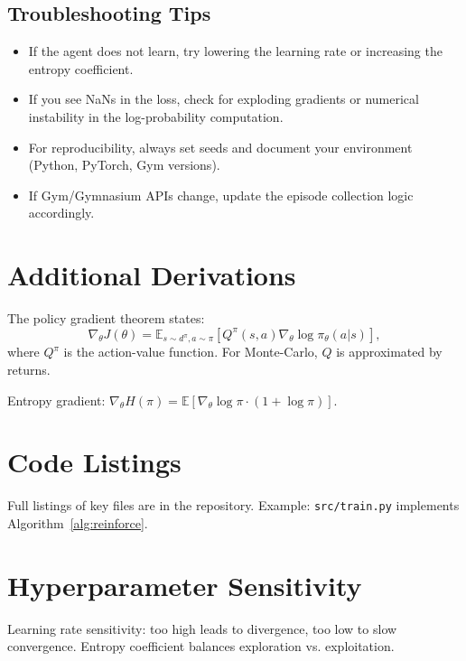 \documentclass[conference]{IEEEtran}
\begin{document}
\subsection{Troubleshooting Tips}
\begin{itemize}
    \item If the agent does not learn, try lowering the learning rate or increasing the entropy coefficient.
    \item If you see NaNs in the loss, check for exploding gradients or numerical instability in the log-probability computation.
    \item For reproducibility, always set seeds and document your environment (Python, PyTorch, Gym versions).
    \item If Gym/Gymnasium APIs change, update the episode collection logic accordingly.
\end{itemize}

\section{Additional Derivations}
\label{app:derivations}

The policy gradient theorem states:
\[
\nabla_\theta J(\theta) = \mathbb{E}_{s \sim d^\pi, a \sim \pi} [Q^\pi(s,a) \nabla_\theta \log \pi_\theta(a|s)],
\]
where $Q^\pi$ is the action-value function. For Monte-Carlo, $Q$ is approximated by returns.

Entropy gradient: $\nabla_\theta H(\pi) = \mathbb{E} [\nabla_\theta \log \pi \cdot (1 + \log \pi)]$.

\section{Code Listings}
\label{app:code}

Full listings of key files are in the repository. Example: \texttt{src/train.py} implements Algorithm~\ref{alg:reinforce}.

\section{Hyperparameter Sensitivity}
\label{app:sensitivity}

Learning rate sensitivity: too high leads to divergence, too low to slow convergence. Entropy coefficient balances exploration vs. exploitation.
\end{document}
